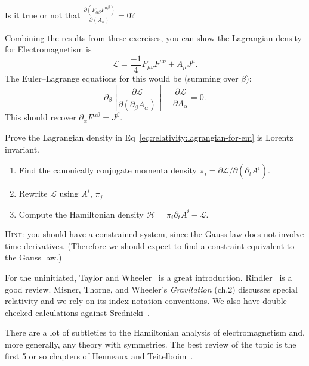 \begin{exercise}
Is it true or not that 
$\displaystyle\frac{\partial(F_{\alpha\beta}F^{\alpha\beta})}{\partial(A_{\nu})}=0$?
\end{exercise}

\M
Combining the results from these exercises, you can show the Lagrangian
density for Electromagnetism is
\begin{equation}\label{eq:relativity:lagrangian-for-em}
\mathcal{L} = \frac{-1}{4}F_{\mu\nu}F^{\mu\nu} + A_{\mu}J^{\mu}.
\end{equation}
The Euler--Lagrange equations for this would be (summing over $\beta$):
\begin{equation}
\partial_{\beta}\left[\frac{\partial\mathcal{L}}{\partial(\partial_{\beta}A_{\alpha})}\right]
-\frac{\partial\mathcal{L}}{\partial A_{\alpha}} = 0.
\end{equation}
This should recover $\partial_{\alpha}F^{\alpha\beta}=J^{\beta}$.

\begin{exercise}
Prove the Lagrangian density in Eq~\eqref{eq:relativity:lagrangian-for-em}
is Lorentz invariant.
\end{exercise}

\begin{exercise}
\begin{enumerate}
\item Find the canonically conjugate momenta density $\pi_{i} = \partial\mathcal{L}/\partial(\partial_{t}A^{i})$.
\item Rewrite $\mathcal{L}$ using $A^{i}$, $\pi_{j}$
\item Compute the Hamiltonian density $\mathcal{H} = \pi_{i}\partial_{t}A^{i}-\mathcal{L}$.
\end{enumerate}
\noindent \textsc{Hint}: you should have a constrained system, since the
Gauss law does not involve time derivatives. (Therefore we should expect
to find a constraint equivalent to the Gauss law.)
\end{exercise}


For the uninitiated, Taylor and Wheeler~\cite{Taylor:1992sp} is a great
introduction. Rindler~\cite{Rindler:1991sr} is a good review.
Misner, Thorne, and Wheeler's \textit{Gravitation} (ch.2) discusses
special relativity and we rely on its index notation conventions.
We also have double checked calculations against Srednicki~\cite{Srednicki:2007qs}.

There are a lot of subtleties to the Hamiltonian analysis of
electromagnetism and, more generally, any theory with symmetries. The
best review of the topic is the first 5 or so chapters of Henneaux and Teitelboim~\cite{Henneaux:1992ig}.

